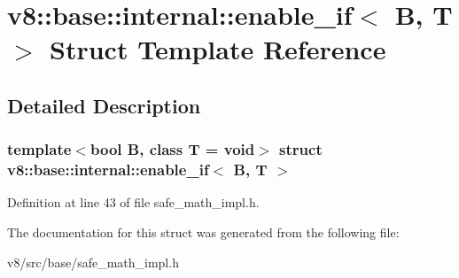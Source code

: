 \hypertarget{structv8_1_1base_1_1internal_1_1enable__if}{}\section{v8\+:\+:base\+:\+:internal\+:\+:enable\+\_\+if$<$ B, T $>$ Struct Template Reference}
\label{structv8_1_1base_1_1internal_1_1enable__if}


\subsection{Detailed Description}
\subsubsection*{template$<$bool B, class T = void$>$\newline
struct v8\+::base\+::internal\+::enable\+\_\+if$<$ B, T $>$}



Definition at line 43 of file safe\+\_\+math\+\_\+impl.\+h.



The documentation for this struct was generated from the following file\+:\begin{DoxyCompactItemize}
\item 
v8/src/base/safe\+\_\+math\+\_\+impl.\+h\end{DoxyCompactItemize}
